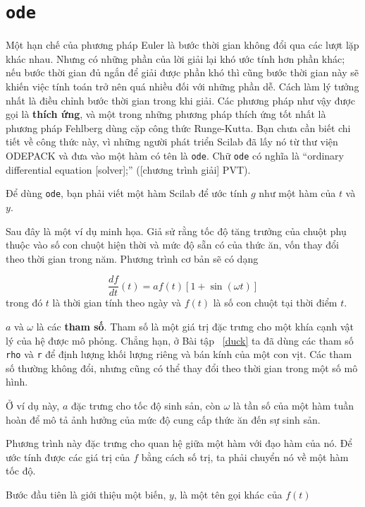 \documentclass[12pt]{book}
\begin{document}
\section{{\tt ode}}
\label{ode}

Một hạn chế của phương pháp Euler là bước thời gian không đổi qua
các lượt lặp khác nhau. Nhưng có những phần của lời giải lại khó
ước tính hơn phần khác; nếu bước thời gian đủ ngắn để giải được
phần khó thì cũng bước thời gian này sẽ khiến việc tính toán trở nên
quá nhiều đối với những phần dễ. Cách làm lý tưởng nhất là điều 
chỉnh bước thời gian trong khi giải. Các phương pháp như vậy được
gọi là {\bf thích ứng}, và một trong những phương pháp thích ứng
tốt nhất là phương pháp Fehlberg dùng cặp công thức 
Runge-Kutta. Bạn chưa cần biết chi tiết về công thức này, vì những
người phát triển Scilab đã lấy nó từ thư viện ODEPACK và đưa vào một hàm có tên là 
{\tt ode}.  Chữ {\tt ode} có nghĩa là ``ordinary differential
equation [solver];'' ([chương trình giải] PVT).

Để dùng {\tt ode}, bạn phải viết một hàm Scilab để ước tính
$g$ như một hàm của $t$ và $y$.


Sau đây là một ví dụ minh họa. Giả sử rằng tốc độ tăng trưởng của
chuột phụ thuộc vào số con chuột hiện thời và mức độ sẵn có của
thức ăn, vốn thay đổi theo thời gian trong năm.
Phương trình cơ bản sẽ có dạng

\[ \frac{df}{dt}(t) = a f(t) \left[1 + \sin (\omega t) \right] \]
%
\noindent trong đó $t$ là thời gian tính theo ngày và $f(t)$ là 
số con chuột tại thời điểm $t$.

$a$ và $\omega$ là các {\bf tham số}. Tham số là một giá trị 
đặc trưng cho một khía cạnh vật lý của hệ được mô phỏng. 
Chẳng hạn, ở Bài tập~ \ref{duck} ta đã dùng các tham số {\tt rho} 
và {\tt r} để định lượng khối lượng riêng và bán kính của một
con vịt. Các tham số thường không đổi, nhưng cũng có thể
thay đổi theo thời gian trong một số mô hình.

Ở ví dụ này, $a$ đặc trưng cho tốc độ sinh sản, còn $\omega$
là tần số của một hàm tuần hoàn để mô tả ảnh hưởng của mức
độ cung cấp thức ăn đến sự sinh sản.

Phương trình này đặc trưng cho quan hệ giữa một hàm với
đạo hàm của nó. Để ước tính được các giá trị của $f$ bằng cách
số trị, ta phải chuyển nó về một hàm tốc độ.

Bước đầu tiên là giới thiệu một biến, $y$, là một tên gọi khác 
của $f(t)$
\end{document}

